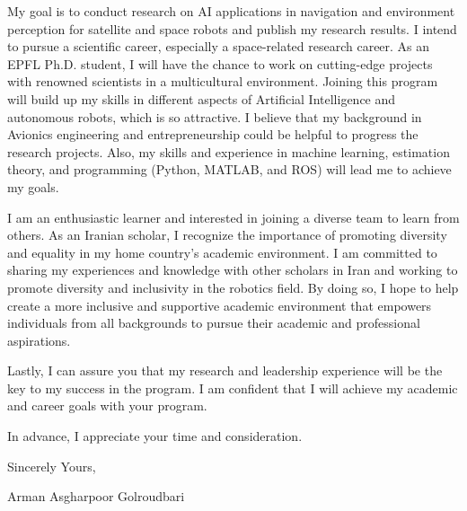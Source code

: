 \documentclass[a4,10pt]{article}
\begin{document}
\begin{large}
\quad My goal is to conduct research on AI applications in navigation and environment perception for satellite and space robots and publish my research results. I intend to pursue a scientific career, especially a space-related research career. As an EPFL Ph.D. student, I will have the chance to work on cutting-edge projects with renowned scientists in a multicultural environment. Joining this program will build up my skills in different aspects of Artificial Intelligence and autonomous robots, which is so attractive. I believe that my background in Avionics engineering and entrepreneurship could be helpful to progress the research projects. Also, my skills and experience in machine learning, estimation theory, and programming (Python, MATLAB, and ROS) will lead me to achieve my goals. \par
\vspace{-0.25cm} \quad I am an enthusiastic learner and interested in joining a diverse team to learn from others. As an Iranian scholar, I recognize the importance of promoting diversity and equality in my home country's academic environment. I am committed to sharing my experiences and knowledge with other scholars in Iran and working to promote diversity and inclusivity in the robotics field. By doing so, I hope to help create a more inclusive and supportive academic environment that empowers individuals from all backgrounds to pursue their academic and professional aspirations. \par
\quad Lastly, I can assure you that my research and leadership experience will be the key to my success in the program. I am confident that I will achieve my academic and career goals with your program. \par
In advance, I appreciate your time and consideration. \par
\vspace{-0.4cm} Sincerely Yours, \par
\vspace{-0.4cm}Arman Asgharpoor Golroudbari \par
\end{large}
\small


\end{document}
